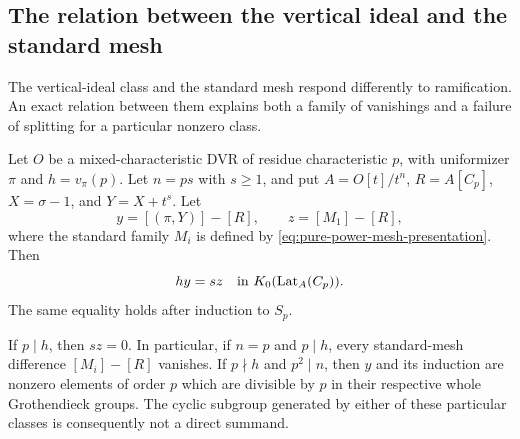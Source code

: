 \subsection{The relation between the vertical ideal and the standard mesh}

The vertical-ideal class and the standard mesh respond differently
to ramification.  An exact relation between them explains both a
family of vanishings and a failure of splitting for a particular
nonzero class.

\begin{theorem}\label{thm:vertical-standard-relation}
Let $O$ be a mixed-characteristic DVR of residue characteristic $p$,
with uniformizer $\pi$ and $h=v_\pi(p)$.  Let $n=ps$ with $s\geq1$,
and put $A=O[t]/t^n$, $R=A[C_p]$, $X=\sigma-1$, and $Y=X+t^s$.
Let
\[
 y=[(\pi,Y)]-[R],\qquad z=[M_1]-[R],
\]
where the standard family $M_i$ is defined by
\eqref{eq:pure-power-mesh-presentation}.  Then
\begin{equation}\label{eq:vertical-standard-relation}
 h y=s z\quad\text{in }K_0(\operatorname{Lat}_A(C_p)).
\end{equation}
The same equality holds after induction to $S_p$.

If $p\mid h$, then $s z=0$.  In particular, if $n=p$ and
$p\mid h$, every standard-mesh difference $[M_i]-[R]$ vanishes.
If $p\nmid h$ and $p^2\mid n$, then $y$ and its induction are
nonzero elements of order $p$ which are divisible by $p$ in their
respective whole Grothendieck groups.  The cyclic subgroup generated
by either of these particular classes is consequently not a direct
summand.
\end{theorem}

